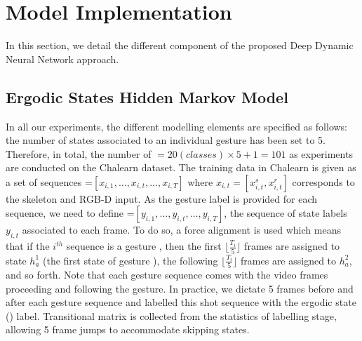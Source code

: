 

\section{Model Implementation}
\label{sec:ModelImplementation}

In this section, we detail the different component of the proposed Deep Dynamic Neural Network approach.

\subsection{Ergodic States Hidden Markov Model}

 In all our experiments, the different modelling elements are specified as follows: the number of states \nsig{} associated to an individual gesture has been set to 5. Therefore, in total, the number of  \tns{}$= 20(classes) \times 5 + 1 = 101$ as experiments are conducted on the Chalearn dataset.
 The training data in Chalearn is given as a set of sequences =$[x_{i,1}, \ldots,x_{i,t},\ldots, x_{i,T}]$ where $x_{i,t}=[x_{i,t}^s, x_{i,t}^r]$ corresponds to the skeleton and RGB-D input. As the gesture label is provided for each sequence, we need to define \framelabelhmm{}=$[y_{i,1}, \ldots,y_{i,t},\ldots, y_{i,T}]$, the sequence of state labels $y_{i,t}$ associated to each frame. To do so, a force alignment is used which means that if the $i^{th}$ sequence is a gesture \gesturea{}, then the first $\lfloor \frac{T_i}{5} \rfloor$ frames are assigned to state $h_a^1$ (the first state of gesture \gesturea{}), the following $\lfloor \frac{T_i}{5} \rfloor$ frames are assigned to $h_a^2$, and so forth.
Note that each gesture sequence comes with the video frames proceeding and following the gesture. In practice, we dictate 5 frames before and after each gesture sequence and labelled this shot sequence with the ergodic state (\ergodicstate{}) label.
Transitional matrix \transitionmatrix{} is collected from the statistics of labelling stage, allowing 5 frame jumps to accommodate skipping states.

%
%
